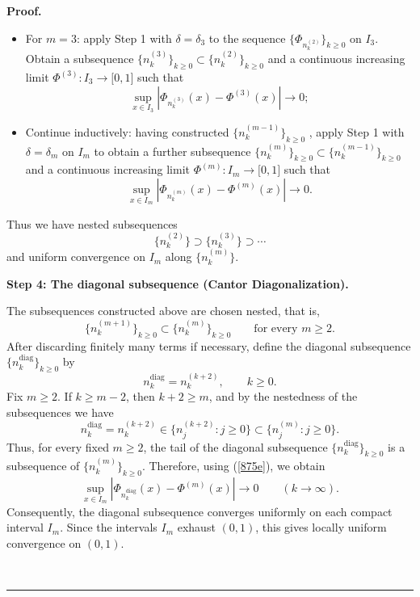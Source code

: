 \documentclass[onecolumn]{article}
\newenvironment{proof}[1][Proof]{\noindent\textbf{#1.} }{\ \rule{0.5em}{0.5em}}
\begin{document}
\begin{proof}
\begin{itemize}
\item For $m=3$: apply Step 1 with $\delta =\delta _{3}$ to the sequence $%
\{\Phi _{n_{k}^{(2)}}\}_{k\geq 0}$ on $I_{3}$. Obtain a subsequence $%
\{n_{k}^{(3)}\}_{k\geq 0}\subset \{n_{k}^{(2)}\}_{k\geq 0}$ and a continuous
increasing limit $\Phi ^{(3)}:I_{3}\rightarrow \lbrack 0,1]$ such that 
\begin{equation}
\sup_{x\in I_{3}}\left\vert \Phi _{n_{k}^{(3)}}(x)-\Phi ^{(3)}(x)\right\vert
\rightarrow 0;  \label{875d}
\end{equation}

\item Continue inductively: having constructed $\{n_{k}^{(m-1)}\}_{k\geq 0}$%
, apply Step 1 with $\delta =\delta _{m}$ on $I_{m}$ to obtain a further
subsequence $\{n_{k}^{(m)}\}_{k\geq 0}\subset \{n_{k}^{(m-1)}\}_{k\geq 0}$
and a continuous increasing limit $\Phi ^{(m)}:I_{m}\rightarrow \lbrack 0,1]$
such that 
\begin{equation}
\sup_{x\in I_{m}}\left\vert \Phi _{n_{k}^{(m)}}(x)-\Phi ^{(m)}(x)\right\vert
\rightarrow 0.  \label{875e}
\end{equation}
\end{itemize}

Thus we have nested subsequences 
\begin{equation}
\{n_{k}^{(2)}\}\supset \{n_{k}^{(3)}\}\supset \cdots  \label{875f}
\end{equation}%
and uniform convergence on $I_{m}$ along $\{n_{k}^{(m)}\}$.

\smallskip \noindent \textbf{Step 4: The diagonal subsequence (Cantor
Diagonalization).}

The subsequences constructed above are chosen nested, that is, 
\begin{equation}
\{n_{k}^{(m+1)}\}_{k\geq 0}\subset \{n_{k}^{(m)}\}_{k\geq 0}\qquad \text{for
every }m\geq 2.  \label{875f1}
\end{equation}%
After discarding finitely many terms if necessary, define the diagonal
subsequence $\{n_{k}^{\mathrm{diag}}\}_{k\geq 0}$ by 
\begin{equation}
n_{k}^{\mathrm{diag}}=n_{k}^{(k+2)},\qquad k\geq 0.  \label{875g}
\end{equation}%
Fix $m\geq 2$. If $k\geq m-2$, then $k+2\geq m$, and by the nestedness of
the subsequences we have 
\begin{equation}
n_{k}^{\mathrm{diag}}=n_{k}^{(k+2)}\in \{n_{j}^{(k+2)}:j\geq 0\}\subset
\{n_{j}^{(m)}:j\geq 0\}.  \label{875h}
\end{equation}%
Thus, for every fixed $m\geq 2$, the tail of the diagonal subsequence $%
\{n_{k}^{\mathrm{diag}}\}_{k\geq 0}$ is a subsequence of $%
\{n_{k}^{(m)}\}_{k\geq 0}$. Therefore, using (\ref{875e}), we obtain 
\begin{equation}
\sup_{x\in I_{m}}\left\vert \Phi _{n_{k}^{\mathrm{diag}}}(x)-\Phi
^{(m)}(x)\right\vert \longrightarrow 0\qquad (k\rightarrow \infty ).
\label{875j}
\end{equation}%
Consequently, the diagonal subsequence converges uniformly on each compact
interval $I_{m}$. Since the intervals $I_{m}$ exhaust $(0,1)$, this gives
locally uniform convergence on $(0,1)$.


\end{proof}
\end{document}
